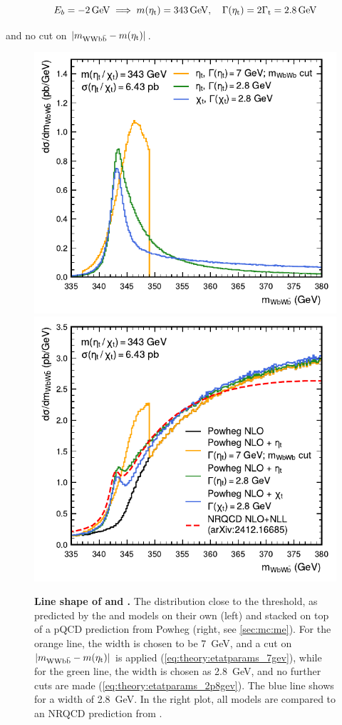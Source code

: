 \begin{equation}
  \label{eq:theory:etatparams_2p8gev}
  E_b = \SI{-2}{\GeV} \implies \metat = \SI{343}{\GeV}, \quad \Gammaetat = 2 \Gammat = \SI{2.8}{\GeV}
\end{equation}

\noindent and no cut on $|m_{\mathrm{WWb\bar{b}}} - m(\mathrm{\eta_t})|$.

\begin{figure}[t]
    \centering
    \includegraphics[width=0.49\linewidth]{figures/ah/etat_chit_small.pdf}
    \hfill
    \includegraphics[width=0.49\linewidth]{figures/ah/powheg_etat_nlo_small.pdf}
    \caption{\textbf{Line shape of \etat and \chit.} The \mWWbb distribution close to the \ttbar threshold, as predicted by the \etat and \chit models on their own (left) and stacked on top of a pQCD \ttbar prediction from Powheg \hvq (right, see \cref{sec:mc:me}). For the orange line, the \etat width is chosen to be \SI{7}{\GeV}, and a cut on $|m_{\mathrm{WWb\bar{b}}} - m(\mathrm{\eta_t})|$ is applied (\cref{eq:theory:etatparams_7gev}), while for the green line, the \etat width is chosen as \SI{2.8}{\GeV}, and no further cuts are made (\cref{eq:theory:etatparams_2p8gev}). The blue line shows \chit for a width of \SI{2.8}{\GeV}. In the right plot, all models are compared to an NRQCD prediction from .}
    \label{fig:theory:etat}
\end{figure}


